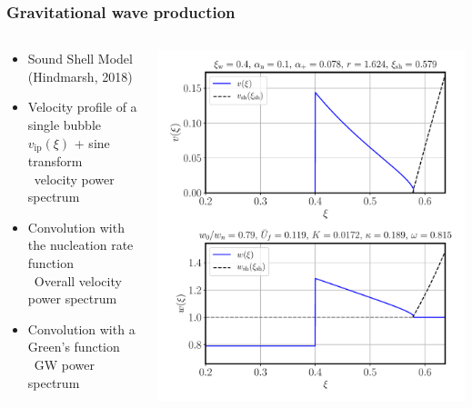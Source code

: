 \begin{frame}
    \frametitle{Gravitational wave production}
    \begin{columns}
    \begin{column}{0.4\textwidth}
        \begin{itemize}
            \item Sound Shell Model (Hindmarsh, 2018)
            \item Velocity profile of a single bubble $v_\text{ip}(\xi)$ + sine transform \\
                \textrightarrow \ velocity power spectrum
            \item Convolution with the nucleation rate function \\
                \textrightarrow \ Overall velocity power spectrum
            \item Convolution with a Green's function \textrightarrow \ GW power spectrum
        \end{itemize}
    \end{column}
    \begin{column}{0.3\textwidth}
        \includegraphics[width=\textwidth]{../fig/lecture_notes/shell_plot_vw_04_alphan_01_review}

\end{column}
\end{columns}
\end{frame}
